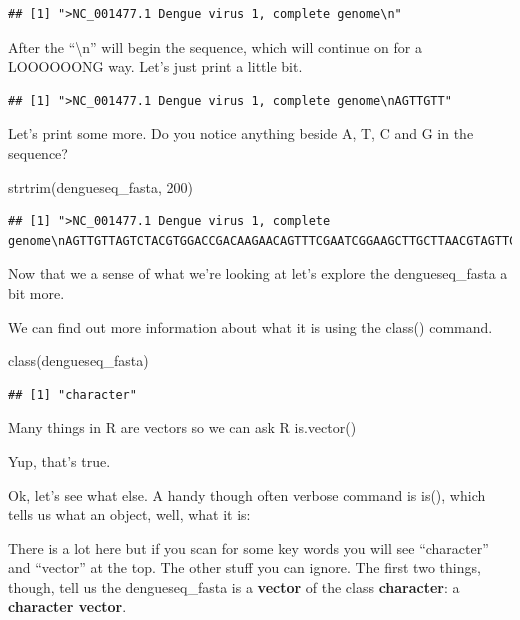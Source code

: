 \documentclass[
]{book}
\newenvironment{Shaded}{\begin{snugshade}}{\end{snugshade}}
\newcommand{\DecValTok}[1]{\textcolor[rgb]{0.00,0.00,0.81}{#1}}
\newcommand{\FunctionTok}[1]{\textcolor[rgb]{0.00,0.00,0.00}{#1}}
\newcommand{\NormalTok}[1]{#1}
\begin{document}
\begin{verbatim}
## [1] ">NC_001477.1 Dengue virus 1, complete genome\n"
\end{verbatim}

After the ``\textbackslash n'' will begin the sequence, which will continue on for a LOOOOOONG way. Let's just print a little bit.

\begin{verbatim}
## [1] ">NC_001477.1 Dengue virus 1, complete genome\nAGTTGTT"
\end{verbatim}

Let's print some more. Do you notice anything beside A, T, C and G in the sequence?

\begin{Shaded}
\begin{Highlighting}[]
\FunctionTok{strtrim}\NormalTok{(dengueseq\_fasta, }\DecValTok{200}\NormalTok{)}
\end{Highlighting}
\end{Shaded}

\begin{verbatim}
## [1] ">NC_001477.1 Dengue virus 1, complete genome\nAGTTGTTAGTCTACGTGGACCGACAAGAACAGTTTCGAATCGGAAGCTTGCTTAACGTAGTTCTAACAGT\nTTTTTATTAGAGAGCAGATCTCTGATGAACAACCAACGGAAAAAGACGGGTCGACCGTCTTTCAATATGC\nTGAAACGCGCGAG"
\end{verbatim}

Now that we a sense of what we're looking at let's explore the dengueseq\_fasta a bit more.

We can find out more information about what it is using the class() command.

\begin{Shaded}
\begin{Highlighting}[]
\FunctionTok{class}\NormalTok{(dengueseq\_fasta)}
\end{Highlighting}
\end{Shaded}

\begin{verbatim}
## [1] "character"
\end{verbatim}

Many things in R are vectors so we can ask R is.vector()

Yup, that's true.

Ok, let's see what else. A handy though often verbose command is is(), which tells us what an object, well, what it is:

There is a lot here but if you scan for some key words you will see ``character'' and ``vector'' at the top. The other stuff you can ignore. The first two things, though, tell us the dengueseq\_fasta is a \textbf{vector} of the class \textbf{character}: a \textbf{character vector}.
\end{document}
